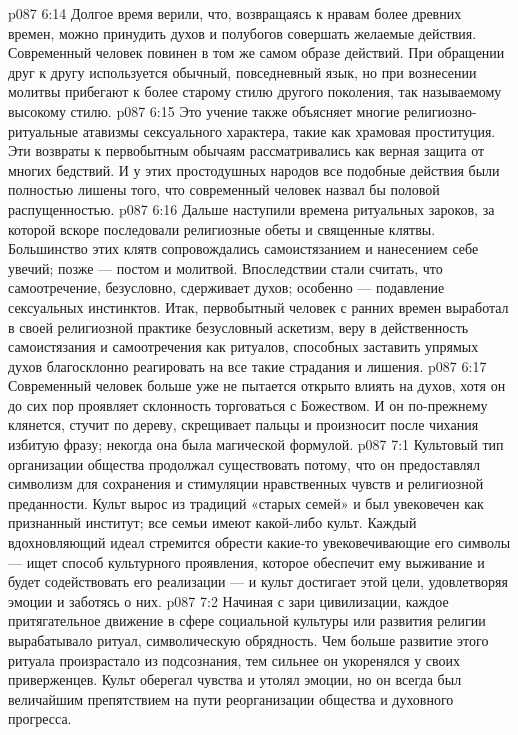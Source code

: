 \vs p087 6:14 Долгое время верили, что, возвращаясь к нравам более древних времен, можно принудить духов и полубогов совершать желаемые действия. Современный человек повинен в том же самом образе действий. При обращении друг к другу используется обычный, повседневный язык, но при вознесении молитвы прибегают к более старому стилю другого поколения, так называемому высокому стилю.
\vs p087 6:15 Это учение также объясняет многие религиозно\hyp{}ритуальные атавизмы сексуального характера, такие как храмовая проституция. Эти возвраты к первобытным обычаям рассматривались как верная защита от многих бедствий. И у этих простодушных народов все подобные действия были полностью лишены того, что современный человек назвал бы половой распущенностью.
\vs p087 6:16 Дальше наступили времена ритуальных зароков, за которой вскоре последовали религиозные обеты и священные клятвы. Большинство этих клятв сопровождались самоистязанием и нанесением себе увечий; позже --- постом и молитвой. Впоследствии стали считать, что самоотречение, безусловно, сдерживает духов; особенно --- подавление сексуальных инстинктов. Итак, первобытный человек с ранних времен выработал в своей религиозной практике безусловный аскетизм, веру в действенность самоистязания и самоотречения как ритуалов, способных заставить упрямых духов благосклонно реагировать на все такие страдания и лишения.
\vs p087 6:17 \pc Современный человек больше уже не пытается открыто влиять на духов, хотя он до сих пор проявляет склонность торговаться с Божеством. И он по\hyp{}прежнему клянется, стучит по дереву, скрещивает пальцы и произносит после чихания избитую фразу; некогда она была магической формулой.
\vs p087 7:1 Культовый тип организации общества продолжал существовать потому, что он предоставлял символизм для сохранения и стимуляции нравственных чувств и религиозной преданности. Культ вырос из традиций «старых семей» и был увековечен как признанный институт; все семьи имеют какой\hyp{}либо культ. Каждый вдохновляющий идеал стремится обрести какие\hyp{}то увековечивающие его символы --- ищет способ культурного проявления, которое обеспечит ему выживание и будет содействовать его реализации --- и культ достигает этой цели, удовлетворяя эмоции и заботясь о них.
\vs p087 7:2 Начиная с зари цивилизации, каждое притягательное движение в сфере социальной культуры или развития религии вырабатывало ритуал, символическую обрядность. Чем больше развитие этого ритуала произрастало из подсознания, тем сильнее он укоренялся у своих приверженцев. Культ оберегал чувства и утолял эмоции, но он всегда был величайшим препятствием на пути реорганизации общества и духовного прогресса.

